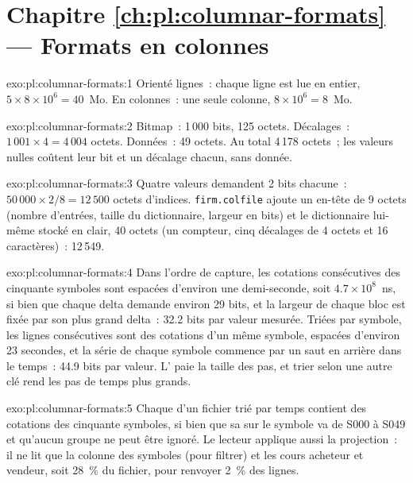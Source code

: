 \section*{Chapitre \ref{ch:pl:columnar-formats} --- Formats en colonnes}

\begin{solution}{exo:pl:columnar-formats:1}
Orienté lignes~: chaque ligne est lue en entier, $5 \times 8 \times 10^6 = 40$~Mo. En colonnes~: une seule colonne, $8 \times 10^6 = 8$~Mo.
\end{solution}

\begin{solution}{exo:pl:columnar-formats:2}
Bitmap~: 1\,000 bits, 125 octets. Décalages~: $1\,001 \times 4 = 4\,004$ octets. Données~: 49 octets. Au total 4\,178 octets~; les valeurs nulles coûtent
leur bit et un décalage chacun, sans donnée.
\end{solution}

\begin{solution}{exo:pl:columnar-formats:3}
Quatre valeurs demandent 2 bits chacune~: $50\,000 \times 2 / 8 = 12\,500$ octets d'indices. \texttt{firm.colfile} ajoute un en-tête de 9 octets
(nombre d'entrées, taille du dictionnaire, largeur en bits) et le dictionnaire lui-même stocké en clair, 40 octets (un compteur, cinq décalages de 4 octets et 16
caractères)~: 12\,549.
\end{solution}

\begin{solution}{exo:pl:columnar-formats:4}
Dans l'ordre de capture, les cotations consécutives des cinquante symboles sont espacées d'environ une demi-seconde, soit $4.7\times10^8$~ns, si bien que chaque delta demande
environ 29 bits, et la largeur de chaque bloc est fixée par son plus grand delta~: 32.2 bits par valeur mesurée. Triées par symbole, les lignes consécutives
sont des cotations d'un même symbole, espacées d'environ 23 secondes, et la série de chaque symbole commence par un saut en arrière dans le temps~: 44.9 bits par valeur. 
L' paie la taille des pas, et trier selon une autre clé rend les pas de temps plus grands.
\end{solution}

\begin{solution}{exo:pl:columnar-formats:5}
Chaque  d'un fichier trié par temps contient des cotations des cinquante symboles, si bien que sa  sur le symbole va de S000 à S049 et qu'aucun groupe ne peut
être ignoré. Le lecteur applique aussi la projection~: il ne lit que la colonne des symboles (pour filtrer) et les cours acheteur et vendeur, soit 28~\%
du fichier, pour renvoyer 2~\% des lignes.
\end{solution}

